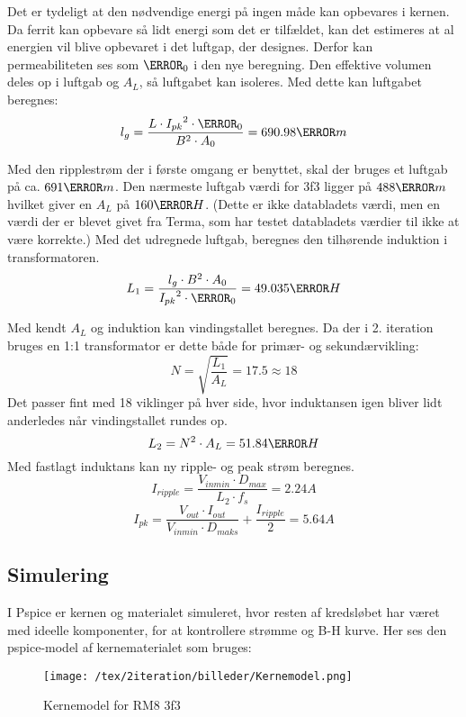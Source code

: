 Det er tydeligt at den nødvendige energi på ingen måde kan opbevares i kernen. Da ferrit kan opbevare så lidt energi som det er tilfældet, kan det estimeres at al energien vil blive opbevaret i det luftgap, der designes. Derfor kan permeabiliteten ses som $\micro_0$ i den nye beregning. Den effektive volumen deles op i luftgab og $A_L$, så luftgabet kan isoleres. Med dette kan luftgabet beregnes: 
\begin{equation} \label{Airgap}
l_g = \frac{L \cdot {I_{pk}}^2 \cdot \micro_0}{B^2 \cdot A_0} = 690.98\micro m
\end{equation}

Med den ripplestrøm der i første omgang er benyttet, skal der bruges et luftgab på ca. $691\micro m$. Den nærmeste luftgab værdi for 3f3 ligger på $488\micro m$ hvilket giver en $A_L$ på $160\nano H$. (Dette er ikke databladets værdi, men en værdi der er blevet givet fra Terma, som har testet databladets værdier til ikke at være korrekte.) Med det udregnede luftgab, beregnes den tilhørende induktion i transformatoren. 
\begin{equation}
L_1 = \frac{l_g \cdot B^2 \cdot A_0}{{I_{pk}}^2 \cdot \micro_0} = 49.035\micro H
\end{equation}

\noindent Med kendt $A_L$ og induktion kan vindingstallet beregnes. Da der i 2. iteration bruges en 1:1 transformator er dette både for primær- og sekundærvikling:
\begin{equation} \label{N}
N = \sqrt{\frac{L_1}{A_L}} = 17.5 \approx 18
\end{equation}
Det passer fint med 18 viklinger på hver side, hvor induktansen igen bliver lidt anderledes når vindingstallet rundes op. 
\begin{equation} \label{L1}
L_2 = N^2 \cdot A_L = 51.84 \micro H
\end{equation}
Med fastlagt induktans kan ny ripple- og peak strøm beregnes.
\begin{equation}
I_{ripple} = \frac{V_{inmin} \cdot D_{max}}{L_2 \cdot f_s} = 2.24A
\end{equation}
\begin{equation}
I_{pk} = \frac{V_{out} \cdot I_{out}}{V_{inmin} \cdot D_{maks}} + \frac{I_{ripple}}{2} = 5.64A
\end{equation}

\subsection{Simulering} \label{Simkernetab}
I Pspice er kernen og materialet simuleret, hvor resten af kredsløbet har været med ideelle komponenter, for at kontrollere strømme og B-H kurve. Her ses den pspice-model af kernematerialet som bruges:
\begin{figure}[H]
	\center
	\texttt{[image: /tex/2iteration/billeder/Kernemodel.png]}
	\caption{Kernemodel for RM8 3f3}
	\label{fig: Kernemodel}
\end{figure}


